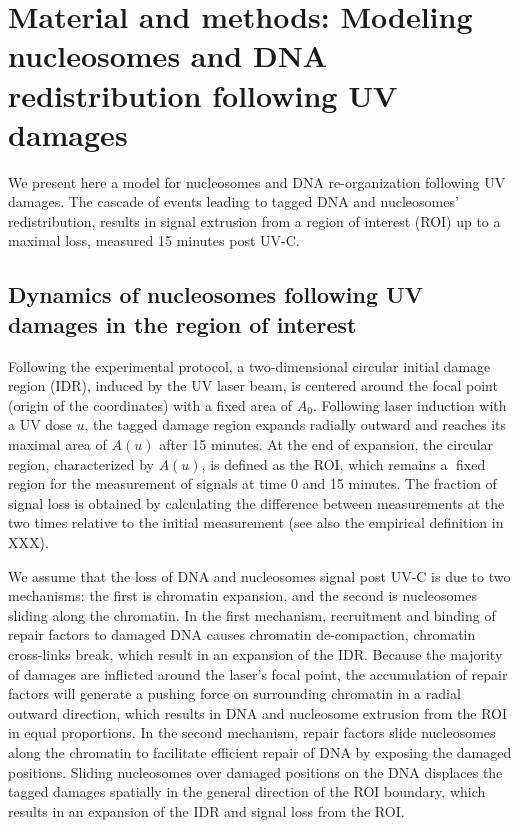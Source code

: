 \documentclass[12pt]{article}
\begin{document}
 \section{Material and methods: Modeling nucleosomes and DNA redistribution following UV damages} 
	
	We present here a model for nucleosomes and DNA re-organization following
	UV damages. The cascade of events leading to tagged DNA and nucleosomes'
	redistribution, results in signal extrusion from a region of interest (ROI) up
	to a maximal loss, measured 15 minutes post UV-C.
	
	\subsection{Dynamics of nucleosomes following UV damages in the region of interest}
	
	Following the experimental protocol, a two-dimensional circular initial damage region (IDR), induced by the UV laser beam, is centered around the
	focal point (origin of the coordinates) with a fixed area of $A_0$. Following
	laser induction with a UV dose $u$, the tagged damage region expands radially outward and reaches its maximal area of $A(u)$ after 15 minutes. At
	the end of expansion, the circular region, characterized by $A(u)$, is defined
	as the ROI, which remains a fixed region for the measurement of signals at
	time 0 and 15 minutes. The fraction of signal loss is obtained by calculating
	the difference between measurements at the two times relative to the initial
	measurement (see also the empirical definition in XXX).
	
	We assume that the loss of DNA and nucleosomes signal post UV-C is due
	to two mechanisms: the first is chromatin expansion, and the second is nucleosomes sliding along the chromatin. In the first mechanism, recruitment and
	binding of repair factors to damaged DNA causes chromatin de-compaction, chromatin cross-links break, which result in an expansion of the 
	IDR. Because the majority of damages are inflicted around the laser's focal point, the accumulation of repair factors will generate a pushing force on
    surrounding chromatin in a radial outward direction, which results in DNA	
    and nucleosome extrusion from the ROI in equal proportions. In the second mechanism, repair factors slide nucleosomes along the chromatin to facilitate
    efficient repair of DNA by exposing the damaged positions. Sliding nucleosomes over damaged positions on the DNA displaces the tagged damages
    spatially in the general direction of the ROI boundary, which results in an
    expansion of the IDR and signal loss from the ROI.
\end{document}
